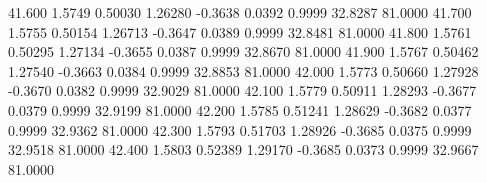   41.600   1.5749   0.50030   1.26280  -0.3638   0.0392   0.9999  32.8287  81.0000
  41.700   1.5755   0.50154   1.26713  -0.3647   0.0389   0.9999  32.8481  81.0000
  41.800   1.5761   0.50295   1.27134  -0.3655   0.0387   0.9999  32.8670  81.0000
  41.900   1.5767   0.50462   1.27540  -0.3663   0.0384   0.9999  32.8853  81.0000
  42.000   1.5773   0.50660   1.27928  -0.3670   0.0382   0.9999  32.9029  81.0000
  42.100   1.5779   0.50911   1.28293  -0.3677   0.0379   0.9999  32.9199  81.0000
  42.200   1.5785   0.51241   1.28629  -0.3682   0.0377   0.9999  32.9362  81.0000
  42.300   1.5793   0.51703   1.28926  -0.3685   0.0375   0.9999  32.9518  81.0000
  42.400   1.5803   0.52389   1.29170  -0.3685   0.0373   0.9999  32.9667  81.0000

